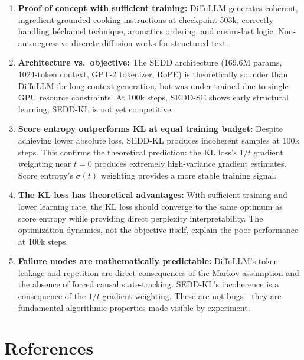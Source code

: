 \documentclass[11pt,a4paper]{article}
\begin{document}
\begin{enumerate}
  \item \textbf{Proof of concept with sufficient training:} DiffuLLM generates coherent, ingredient-grounded cooking instructions at checkpoint 503k, correctly handling b\'echamel technique, aromatics ordering, and cream-last logic. Non-autoregressive discrete diffusion works for structured text.

  \item \textbf{Architecture vs.\ objective:} The SEDD architecture (169.6M params, 1024-token context, GPT-2 tokenizer, RoPE) is theoretically sounder than DiffuLLM for long-context generation, but was under-trained due to single-GPU resource constraints. At 100k steps, SEDD-SE shows early structural learning; SEDD-KL is not yet competitive.

  \item \textbf{Score entropy outperforms KL at equal training budget:} Despite achieving lower absolute loss, SEDD-KL produces incoherent samples at 100k steps. This confirms the theoretical prediction: the KL loss's $1/t$ gradient weighting near $t = 0$ produces extremely high-variance gradient estimates. Score entropy's $\dot{\sigma}(t)$ weighting provides a more stable training signal.

  \item \textbf{The KL loss has theoretical advantages:} With sufficient training and lower learning rate, the KL loss should converge to the same optimum as score entropy while providing direct perplexity interpretability. The optimization dynamics, not the objective itself, explain the poor performance at 100k steps.

  \item \textbf{Failure modes are mathematically predictable:} DiffuLLM's token leakage and repetition are direct consequences of the Markov assumption and the absence of forced causal state-tracking. SEDD-KL's incoherence is a consequence of the $1/t$ gradient weighting. These are not bugs---they are fundamental algorithmic properties made visible by experiment.
\end{enumerate}

\section*{References}
\end{document}
